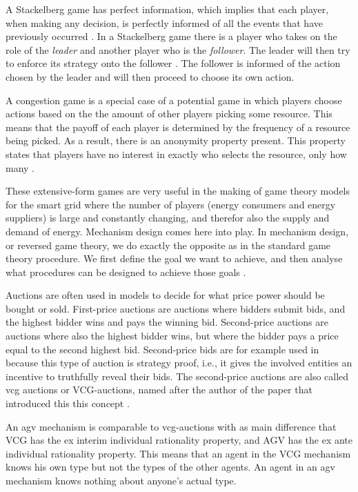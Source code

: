A Stackelberg game has perfect information, which implies that each player, when making any decision, is perfectly informed of all the events that have previously occurred \cite{CourseInGameTheory}.
In a Stackelberg game there is a player who takes on the role of the \textit{leader} and another player who is the \textit{follower}. The leader will then try to enforce its strategy onto the follower \cite{ShohamLeyton-Brown2008}. The follower is informed of the action chosen by the leader and will then proceed to choose its own action. 

A congestion game is a special case of a potential game \cite{IbarsNavarroGiupponi2010, MondererShapley1996, ShohamLeyton-Brown2008} in which players choose actions based on the the amount of other players picking some resource. This means that the payoff of each player is determined by the frequency of a resource being picked. As a result, there is an anonymity property present. This property states that players have no interest in exactly who selects the resource, only how many \cite{ShohamLeyton-Brown2008}.


These extensive-form games are very useful in the making of game theory models for the smart grid where the number of players (energy consumers and energy suppliers) is large and constantly changing, and therefor also the supply and demand of energy. Mechanism design comes here into play. In mechanism design, or reversed game theory, we do exactly the opposite as in the standard game theory procedure. We first define the goal we want to achieve, and then analyse what procedures can be designed to achieve those goals \cite{SalfatiRabinovici2014}. 

Auctions are often used in models to decide for what price power should be bought or sold. First-price auctions are auctions where bidders submit bids, and the highest bidder wins and pays the winning bid. Second-price auctions are auctions where also the highest bidder wins, but where the bidder pays a price equal to the second highest bid. Second-price bids are for example used in \cite{SaadHanPoorEtAl2011} because this type of auction is strategy proof, i.e., it gives the involved entities an incentive to truthfully reveal their bids. The second-price auctions are also called \ac{vcg} auctions or VCG-auctions, named after the author of the paper that introduced this this concept \cite{Vickrey1961}.

An \ac{agv} mechanism is comparable to \ac{vcg}-auctions with as main difference that VCG has the ex interim individual rationality property, and AGV has the ex ante individual rationality property\cite{ShohamLeyton-Brown2008}. This means that an agent in the VCG mechanism knows his own type but not the types of the other agents. An agent in an \ac{agv} mechanism knows nothing about anyone’s actual type. 

